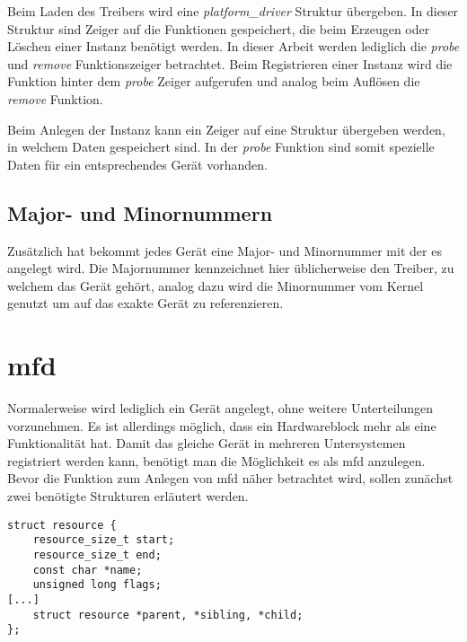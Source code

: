 Beim Laden des Treibers wird eine \textit{platform\_driver} Struktur übergeben. In dieser Struktur sind Zeiger auf die Funktionen gespeichert, die beim Erzeugen oder Löschen einer Instanz benötigt werden.  
In dieser Arbeit werden lediglich die \textit{probe} und \textit{remove} Funktionszeiger betrachtet. Beim Registrieren einer Instanz wird die Funktion hinter dem \textit{probe} Zeiger aufgerufen und analog beim Auflösen die \textit{remove} Funktion.\cite{corbetplatform} 

Beim Anlegen der Instanz kann ein Zeiger auf eine Struktur übergeben werden, in welchem Daten gespeichert sind. In der \textit{probe} Funktion sind somit spezielle Daten für ein entsprechendes Gerät vorhanden. \cite{corbetplatform} 

\subsection{Major- und Minornummern}\label{sec:mmnum_t}
Zusätzlich hat bekommt jedes Gerät eine Major- und Minornummer mit der es angelegt wird.
Die Majornummer kennzeichnet hier üblicherweise den Treiber, zu welchem das Gerät gehört, analog dazu wird die Minornummer vom Kernel genutzt um auf das exakte Gerät zu referenzieren. \citep[S. 43f]{corbet2005linux} 

\section{\acl{mfd}}\label{sec:mfd_t}
Normalerweise wird lediglich ein Gerät angelegt, ohne weitere Unterteilungen vorzunehmen. Es ist allerdings möglich, dass ein Hardwareblock mehr als eine Funktionalität hat. Damit das gleiche Gerät in mehreren Untersystemen registriert werden kann, benötigt man die Möglichkeit es als \ac{mfd} anzulegen. \cite{bellonimfd}\\

Bevor die Funktion zum Anlegen von \ac{mfd} näher betrachtet wird, sollen zunächst zwei benötigte Strukturen erläutert werden.

\begin{lstfloat}
\begin{lstlisting}
struct resource {
	resource_size_t start;
	resource_size_t end;
	const char *name;
	unsigned long flags;
[...]
	struct resource *parent, *sibling, *child;
};
\end{lstlisting}
\end{lstfloat}

